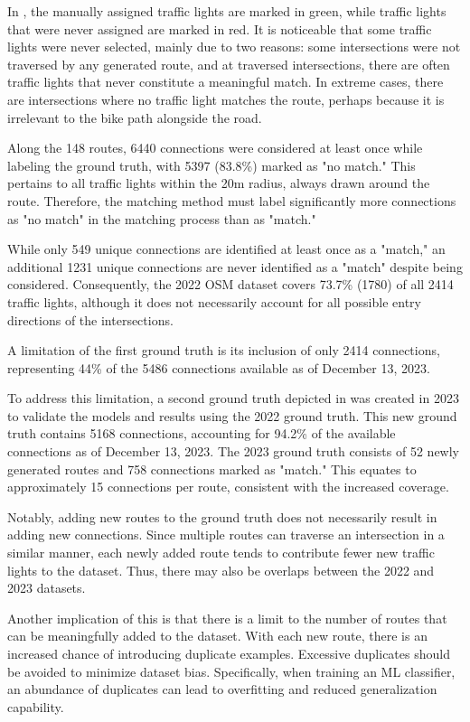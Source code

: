 In , the manually assigned traffic lights are marked in green, while traffic lights that were never assigned are marked in red. It is noticeable that some traffic lights were never selected, mainly due to two reasons: some intersections were not traversed by any generated route, and at traversed intersections, there are often traffic lights that never constitute a meaningful match. In extreme cases, there are intersections where no traffic light matches the route, perhaps because it is irrelevant to the bike path alongside the road.

Along the 148 routes, 6440 connections were considered at least once while labeling the ground truth, with 5397 (83.8\%) marked as "no match." This pertains to all traffic lights within the 20m radius, always drawn around the route. Therefore, the matching method must label significantly more connections as "no match" in the matching process than as "match."

While only 549 unique connections are identified at least once as a "match," an additional 1231 unique connections are never identified as a "match" despite being considered. Consequently, the 2022 OSM dataset covers 73.7\% (1780) of all 2414 traffic lights, although it does not necessarily account for all possible entry directions of the intersections.

A limitation of the first ground truth is its inclusion of only 2414 connections, representing 44\% of the 5486 connections available as of December 13, 2023.

To address this limitation, a second ground truth depicted in  was created in 2023 to validate the models and results using the 2022 ground truth. This new ground truth contains 5168 connections, accounting for 94.2\% of the available connections as of December 13, 2023. The 2023 ground truth consists of 52 newly generated routes and 758 connections marked as "match." This equates to approximately 15 connections per route, consistent with the increased coverage.

Notably, adding new routes to the ground truth does not necessarily result in adding new connections. Since multiple routes can traverse an intersection in a similar manner, each newly added route tends to contribute fewer new traffic lights to the dataset. Thus, there may also be overlaps between the 2022 and 2023 datasets.

Another implication of this is that there is a limit to the number of routes that can be meaningfully added to the dataset. With each new route, there is an increased chance of introducing duplicate examples. Excessive duplicates should be avoided to minimize dataset bias. Specifically, when training an ML classifier, an abundance of duplicates can lead to overfitting and reduced generalization capability.

